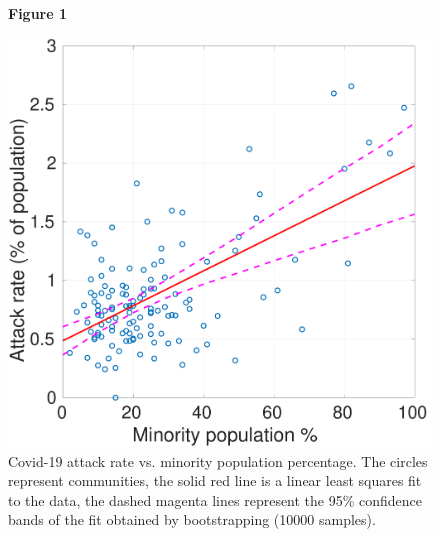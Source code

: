\documentclass[twoside,12pt,onecolumn]{article}
\begin{document}



\newpage
\begin{figure}[t!]
  \begin{center}
  \textbf{Figure 1}

  \includegraphics[width=0.6\linewidth]{AttackRateVsMinorityPopulation.pdf}
  \end{center}

  \caption{Covid-19 attack rate vs. minority population percentage. The circles represent communities, the solid red line is a linear least squares fit to the data, the dashed magenta lines represent the 95\% confidence bands of the fit obtained by bootstrapping (10000 samples).}

  \label{fig:AttackRateVsMinority}
\end{figure}
\clearpage
\end{document}
